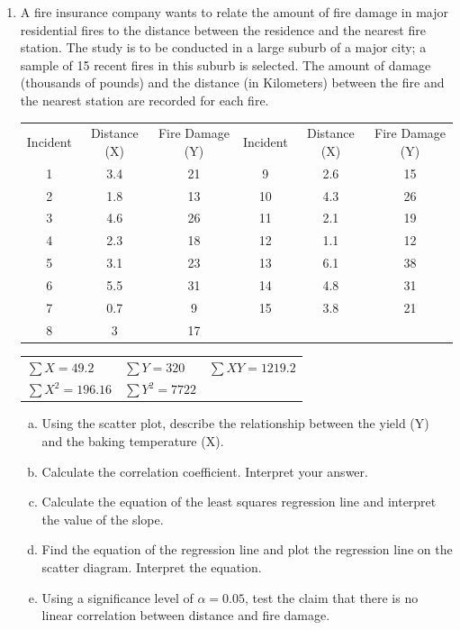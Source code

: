 \documentclass[a4paper,12pt]{article}
\begin{document}
\begin{enumerate}
\item A fire insurance company wants to relate the amount of fire damage in major residential fires to the distance between the residence and the nearest fire station. The study is to be conducted in a large suburb of a major city; a sample of 15 recent fires in this suburb is selected. The amount of damage (thousands of pounds) and the distance (in Kilometers) between the fire and the nearest station are recorded for each fire.

\begin{center}
\begin{tabular}{|c|c|c|c|c|c|}
  \hline
Incident	&	Distance (X) 	&	Fire Damage (Y)   	&	Incident	&	Distance (X) 	& Fire Damage (Y)   		 \\
1	&	3.4	&	21	&	9	&	2.6	&	15	\\
2	&	1.8	&	13	&	10	&	4.3	&	26	\\
3	&	4.6	&	26	&	11	&	2.1	&	19	\\
4	&	2.3	&	18	&	12	&	1.1	&	12	\\
5	&	3.1	&	23	&	13	&	6.1	&	38	\\
6	&	5.5	&	31	&	14	&	4.8	&	31	\\
7	&	0.7	&	9	&	15	&	3.8	&	21	\\
8	&	3	&	17	&		&		&		\\

  \hline
\end{tabular}



\begin{tabular}{lll}
  $\sum X = 49.2$ & $\sum Y = 320$ & $\sum XY = 1219.2$ \\
  $\sum X^2 = 196.16$ & $\sum Y^2 = 7722$ &  \\
 \end{tabular}
 \end{center}


\begin{enumerate}[(a)]
	\item Using the scatter plot, describe the relationship between the yield (Y) and the baking temperature (X).
	\item Calculate the correlation coefficient. Interpret your answer.
	\item Calculate the equation of the least squares regression line and interpret the value of the slope.
\item Find the equation of the regression line and plot the regression line on the scatter  diagram. Interpret the equation. 	
\item Using a significance level of $\alpha = 0.05$, test the claim that there is no linear correlation between distance and fire damage. 		
\end{enumerate}


\end{enumerate}
\end{document}
